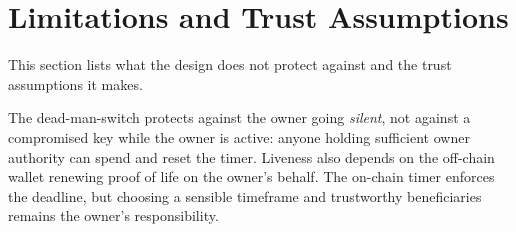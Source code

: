 \section{Limitations and Trust Assumptions}
\label{sec:limitations}

This section lists what the design does not protect against and the trust assumptions it makes.

\begin{caveatbox}
The dead-man-switch protects against the owner going \emph{silent}, not against a
compromised key while the owner is active: anyone holding sufficient owner
authority can spend and reset the timer. Liveness also depends on the off-chain
wallet renewing proof of life on the owner's behalf. The on-chain timer
enforces the deadline, but choosing a sensible timeframe and trustworthy
beneficiaries remains the owner's responsibility.
\end{caveatbox}

